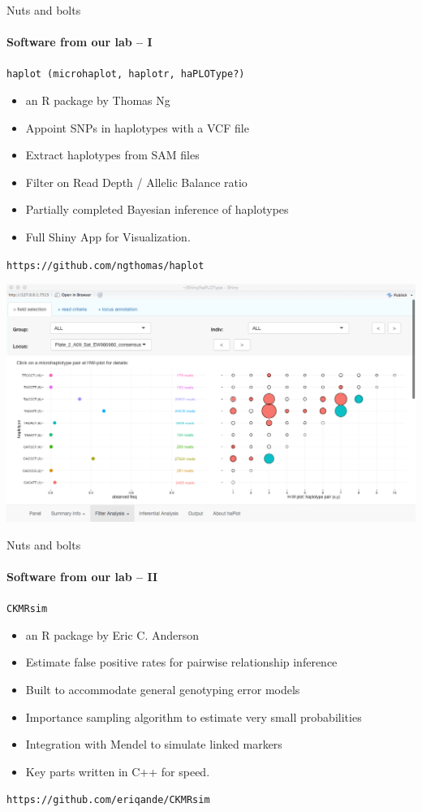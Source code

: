 \documentclass[letter,graphicx]{beamer}
\begin{document}
\begin{frame}{Nuts and bolts}
\framesubtitle{Software from our lab -- I}

{\tt {\Large haplot} (microhaplot, haplotr, haPLOType?)} 
\begin{itemize}
\item an R package by Thomas Ng
\item Appoint SNPs in haplotypes with a VCF file
\item Extract haplotypes from SAM files
\item Filter on Read Depth / Allelic Balance ratio
\item Partially completed Bayesian inference of haplotypes
\item Full Shiny App for Visualization.
\end{itemize}

{\tt https://github.com/ngthomas/haplot}
\end{frame}


\newpage
\mbox{}
\vspace*{2em}
\mbox{}
\includegraphics[width=\textwidth]{mhap_figs/haplot2.png}



\begin{frame}{Nuts and bolts}
\framesubtitle{Software from our lab -- II}

{\tt\Large CKMRsim}
\begin{itemize}
\item an R package by Eric C. Anderson
\item Estimate false positive rates for pairwise relationship inference
\item Built to accommodate general genotyping error models
\item Importance sampling algorithm to estimate very small probabilities
\item Integration with Mendel to simulate linked markers
\item Key parts written in C++ for speed.
\end{itemize}

{\tt https://github.com/eriqande/CKMRsim}
\end{frame}
\end{document}

